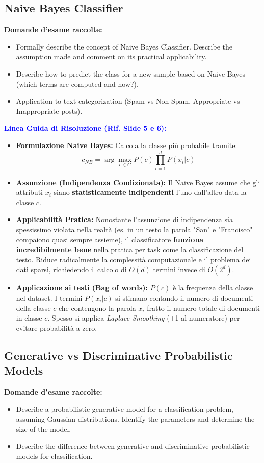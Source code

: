 \documentclass[11pt,a4paper]{article}
\begin{document}
\subsection{Naive Bayes Classifier}
\textbf{Domande d'esame raccolte:}
\begin{itemize}
    \item Formally describe the concept of Naive Bayes Classifier. Describe the assumption made and comment on its practical applicability.
    \item Describe how to predict the class for a new sample based on Naive Bayes (which terms are computed and how?).
    \item Application to text categorization (Spam vs Non-Spam, Appropriate vs Inappropriate posts).
\end{itemize}

\textbf{\textcolor{blue}{Linea Guida di Risoluzione (Rif. Slide 5 e 6):}}
\begin{itemize}
    \item \textbf{Formulazione Naive Bayes:} Calcola la classe più probabile tramite:
    $$ c_{NB} = \arg\max_{c \in C} P(c) \prod_{i=1}^d P(x_i | c) $$
    \item \textbf{Assunzione (Indipendenza Condizionata):} Il Naive Bayes assume che gli attributi $x_i$ siano \textbf{statisticamente indipendenti} l'uno dall'altro data la classe $c$. 
    \item \textbf{Applicabilità Pratica:} Nonostante l'assunzione di indipendenza sia spessissimo violata nella realtà (es. in un testo la parola "San" e "Francisco" compaiono quasi sempre assieme), il classificatore \textbf{funziona incredibilmente bene} nella pratica per task come la classificazione del testo. Riduce radicalmente la complessità computazionale e il problema dei dati sparsi, richiedendo il calcolo di $O(d)$ termini invece di $O(2^d)$.
    \item \textbf{Applicazione ai testi (Bag of words):} $P(c)$ è la frequenza della classe nel dataset. I termini $P(x_i|c)$ si stimano contando il numero di documenti della classe $c$ che contengono la parola $x_i$ fratto il numero totale di documenti in classe $c$. Spesso si applica \textit{Laplace Smoothing} (+1 al numeratore) per evitare probabilità a zero.
\end{itemize}

\subsection{Generative vs Discriminative Probabilistic Models}
\textbf{Domande d'esame raccolte:}
\begin{itemize}
    \item Describe a probabilistic generative model for a classification problem, assuming Gaussian distributions. Identify the parameters and determine the size of the model.
    \item Describe the difference between generative and discriminative probabilistic models for classification.
\end{itemize}
\end{document}
